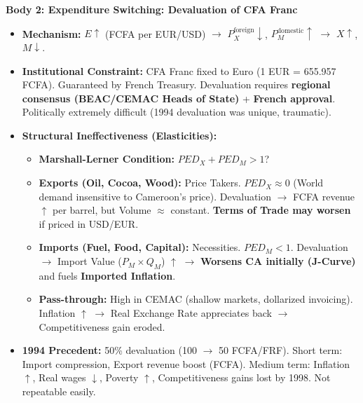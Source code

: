 \documentclass[11pt]{article}
\begin{document}
\begin{exoresolu}
\textbf{Body 2: Expenditure Switching: Devaluation of CFA Franc}
\begin{itemize}
    \item \textbf{Mechanism:} $E \uparrow$ (FCFA per EUR/USD) $\rightarrow$ $P_X^{\text{foreign}} \downarrow$, $P_M^{\text{domestic}} \uparrow$ $\rightarrow$ $X \uparrow$, $M \downarrow$.
    \item \textbf{Institutional Constraint:} CFA Franc fixed to Euro (1 EUR = 655.957 FCFA). Guaranteed by French Treasury. Devaluation requires \textbf{regional consensus (BEAC/CEMAC Heads of State)} + \textbf{French approval}. Politically extremely difficult (1994 devaluation was unique, traumatic).
    \item \textbf{Structural Ineffectiveness (Elasticities):}
        \begin{itemize}
            \item \textbf{Marshall-Lerner Condition:} $PED_X + PED_M > 1$?
            \item \textbf{Exports (Oil, Cocoa, Wood):} Price Takers. $PED_X \approx 0$ (World demand insensitive to Cameroon's price). Devaluation $\rightarrow$ FCFA revenue $\uparrow$ per barrel, but Volume $\approx$ constant. \textbf{Terms of Trade may worsen} if priced in USD/EUR.
            \item \textbf{Imports (Fuel, Food, Capital):} Necessities. $PED_M < 1$. Devaluation $\rightarrow$ Import Value ($P_M \times Q_M$) $\uparrow$ $\rightarrow$ \textbf{Worsens CA initially (J-Curve)} and fuels \textbf{Imported Inflation}.
            \item \textbf{Pass-through:} High in CEMAC (shallow markets, dollarized invoicing). Inflation $\uparrow$ $\rightarrow$ Real Exchange Rate appreciates back $\rightarrow$ Competitiveness gain eroded.
        \end{itemize}
    \item \textbf{1994 Precedent:} 50\% devaluation (100 $\rightarrow$ 50 FCFA/FRF). Short term: Import compression, Export revenue boost (FCFA). Medium term: Inflation $\uparrow$, Real wages $\downarrow$, Poverty $\uparrow$, Competitiveness gains lost by 1998. Not repeatable easily.
\end{itemize}


\end{exoresolu}
\end{document}
